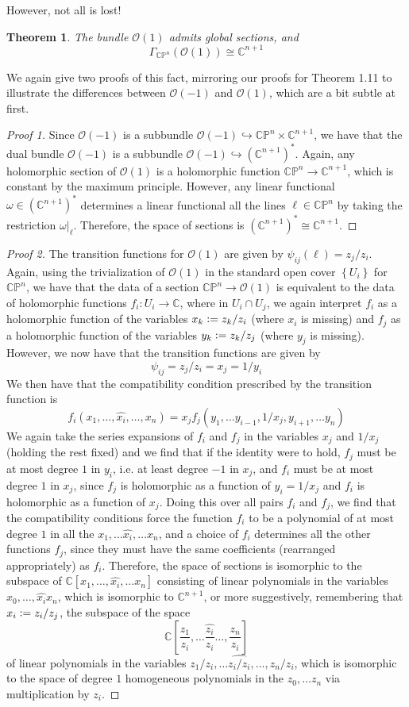 \documentclass[psamsfonts, 12pt]{amsart}
\newtheorem{thm}{Theorem}[section]
\theoremstyle{definition}
\theoremstyle{remark}
\renewcommand{\O}{\mathscr{O}}
\newcommand{\C}{\mathbb{C}}
\newcommand{\CP}{\mathbb{CP}}
\newcommand{\set}[1]{\left\lbrace #1 \right\rbrace}
\newcommand{\defeq}{\vcentcolon=}
\begin{document}
%
However, not all is lost!
%
\begin{thm}
The bundle $\O(1)$ admits global sections, and
\[
\Gamma_{\CP^n}(\O(1)) \cong \C^{n+1}
\]
\end{thm}
%
We again give two proofs of this fact, mirroring our proofs for Theorem 1.11 to
illustrate the differences between $\O(-1)$ and $\O(1)$, which are a bit subtle at
first.
%
\begin{proof}[Proof 1]
Since $\O(-1)$ is a subbundle $\O(-1) \hookrightarrow \CP^n \times \C^{n+1}$, we
have that the dual bundle $\O(-1)$ is a subbundle $\O(-1) \hookrightarrow (\C^{n+1})^*$.
Again, any holomorphic section of $\O(1)$ is a holomorphic function
$\CP^n \to \C^{n+1}$, which is constant by the maximum principle. However, any
linear functional $\omega \in (\C^{n+1})^*$ determines a linear functional
all the lines $\ell \in \CP^n$ by taking the restriction $\omega|_\ell$. Therefore,
the space of sections is $(\C^{n+1})^* \cong \C^{n+1}$.
\end{proof}
%
\begin{proof}[Proof 2]
The transition functions for $\O(1)$ are given by $\psi_{ij}(\ell) = z_j/z_i$. Again,
using the trivialization of $\O(1)$ in the standard open cover $\set{U_i}$ for
$\CP^n$, we have that the data of a section $\CP^n \to \O(1)$ is equivalent to
the data of holomorphic functions $f_i : U_i \to \C$, where in $U_i \cap U_j$, we again
interpret $f_i$ as a holomorphic function of the variables  $x_k \defeq z_k/z_i$
(where $x_i$ is missing) and $f_j$ as a holomorphic function of the variables
$y_k \defeq z_k/z_j$ (where $y_j$ is missing). However, we now have that the transition
functions are given by
\[
\psi_{ij} = z_j/z_i = x_j = 1/y_i
\]
We then have that the compatibility condition prescribed by the transition function
is
\[
f_i(x_1,\ldots,\widehat{x_i},\ldots, x_n) =
x_jf_j(y_1,\ldots y_{i-1}, 1/x_j, y_{i+1}, \ldots y_n)
\]
We again take the series expansions of $f_i$ and $f_j$ in the variables $x_j$
and $1/x_j$ (holding the rest fixed)  and we find that if the identity were to hold,
$f_j$ must be at most degree $1$ in $y_i$, i.e. at least degree $-1$ in $x_j$,
and $f_i$ must be at most degree $1$ in $x_j$, since $f_j$ is holomorphic as a function
of $y_i = 1/x_j$ and $f_i$ is holomorphic as a function of $x_j$. Doing this over
all pairs $f_i$ and $f_j$, we find that the compatibility conditions force the
function $f_i$ to be a polynomial of at most degree $1$ in all the
$x_1, \ldots \widehat{x_i}, \ldots x_n$, and a choice of $f_i$ determines all the other
functions $f_j$, since they must have the same coefficients (rearranged appropriately)
as $f_i$. Therefore, the space of sections is isomorphic to the subspace of
$\C[x_1,\ldots,\widehat{x_i},\ldots x_n]$ consisting of linear polynomials in the
variables $x_0, \ldots, \widehat{x_i} x_n$, which is isomorphic to $\C^{n+1}$, or more
suggestively, remembering that $x_i \defeq z_i/z_j$,  the subspace of the space
\[
\C\left[\frac{z_1}{z_i},\ldots \widehat{\frac{z_i}{z_i}}\ldots,\frac{z_n}{z_i}\right]
\]
of linear polynomials in the variables $z_1/z_i,\ldots \widehat{z_i/z_i},\ldots ,z_n/z_i$,
which is isomorphic to the space of degree $1$ homogeneous polynomials in the
$z_0,\ldots z_n$ via multiplication by $z_i$.
\end{proof}
\end{document}
